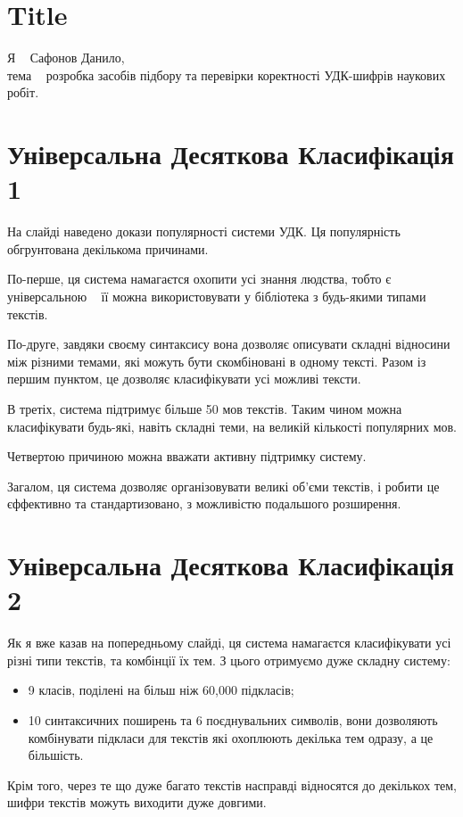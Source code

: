 \documentclass{article}
\let\oldsection\section
\renewcommand{\section}{\clearpage\oldsection}
\begin{document}
\section{Title}
Я \textemdash~ Сафонов Данило,\\
тема \textemdash~
розробка засобів підбору та перевірки коректності УДК-шифрів наукових робіт.

\section{Універсальна Десяткова Класифікація 1}
На слайді наведено докази популярності системи УДК.
Ця популярність обгрунтована декількома причинами.

По-перше, ця система намагаєтся охопити усі знання людства, тобто є універсальною
\textemdash~ її можна використовувати у бібліотека з будь-якими типами текстів.

По-друге, завдяки своєму синтаксису вона дозволяє описувати складні відносини
між різними темами, які можуть бути скомбіновані в одному тексті.
Разом із першим пунктом, це дозволяє класифікувати усі можливі тексти.

В третіх, система підтримує більше 50 мов текстів.
Таким чином можна класифікувати будь-які, навіть складні теми,
на великій кількості популярних мов.

Четвертою причиною можна вважати активну підтримку систему.

Загалом, ця система дозволяє організовувати великі об'єми текстів,
і робити це єффективно та стандартизовано, з можливістю подальшого розширення.

\section{Універсальна Десяткова Класифікація 2}
Як я вже казав на попередньому слайді, ця система намагаєтся класифікувати
усі різні типи текстів, та комбінції їх тем.
З цього отримуємо дуже складну систему:
\begin{itemize}
  \item 9 класів, поділені на більш ніж 60,000 підкласів;
  \item 10 синтаксичних поширень та 6 поєднувальних символів,
	  вони дозволяють комбінувати підкласи для текстів які охоплюють декілька тем одразу,
		а це більшість.
\end{itemize}

Крім того, через те що дуже багато текстів насправді відносятся до декількох тем,
шифри текстів можуть виходити дуже довгими.
\end{document}
